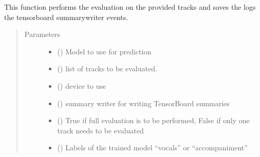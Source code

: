 \documentclass[letterpaper,10pt,english]{sphinxmanual}
\begin{document}
\begin{fulllineitems}
\label{\detokenize{docs/source/train:train.train_model.evaluation}}
This function performs the evaluation on the provided tracks and saves the logs the tensorboard summarywriter events.
\begin{quote}\begin{description}
\item[{Parameters}] \leavevmode\begin{itemize}
\item {} 
 ({\hyperref[\detokenize{docs/source/train:train.model.Generalised_Recurrent_Model}]{}}) \textendash{} Model to use for prediction

\item {} 
 (\sphinxstyleliteralemphasis{\sphinxupquote{{[}}}{\hyperref[\detokenize{docs/source/application.model:application.model.Track}]{\sphinxcrossref{\sphinxstyleliteralemphasis{\sphinxupquote{Track}}}}}\sphinxstyleliteralemphasis{\sphinxupquote{{]}}}) \textendash{} list of tracks to be evaluated.

\item {} 
 () \textendash{} device to use

\item {} 
 () \textendash{} summary writer for writing TensorBoard summaries

\item {} 
 () \textendash{} True if full evaluation is to be performed, False if only one track needs to be evaluated

\item {} 
 () \textendash{} Labels of the trained model “vocals” or “accompaniment”

\end{itemize}

\end{description}\end{quote}

\end{fulllineitems}
\end{document}
